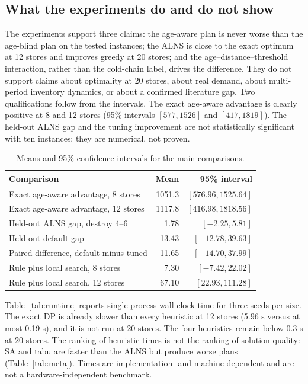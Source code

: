 \documentclass[preprint,12pt]{elsarticle}
\begin{document}
\subsection{What the experiments do and do not show}

The experiments support three claims: the age-aware plan is never worse than the age-blind plan on the tested instances; the ALNS is close to the exact optimum at 12 stores and improves greedy at 20 stores; and the age--distance--threshold interaction, rather than the cold-chain label, drives the difference. They do not support claims about optimality at 20 stores, about real demand, about multi-period inventory dynamics, or about a confirmed literature gap. Two qualifications follow from the intervals. The exact age-aware advantage is clearly positive at 8 and 12 stores (95\% intervals $[577,1526]$ and $[417,1819]$). The held-out ALNS gap and the tuning improvement are not statistically significant with ten instances; they are numerical, not proven.

\begin{table}[t]
\centering
\caption{Means and 95\% confidence intervals for the main comparisons.}
\label{tab:ci}
\begin{tabular}{lrr}
\toprule
Comparison & Mean & 95\% interval \\
\midrule
Exact age-aware advantage, 8 stores & 1051.3 & $[576.96,1525.64]$ \\
Exact age-aware advantage, 12 stores & 1117.8 & $[416.98,1818.56]$ \\
Held-out ALNS gap, destroy 4--6 & 1.78 & $[-2.25,5.81]$ \\
Held-out default gap & 13.43 & $[-12.78,39.63]$ \\
Paired difference, default minus tuned & 11.65 & $[-14.70,37.99]$ \\
Rule plus local search, 8 stores & 7.30 & $[-7.42,22.02]$ \\
Rule plus local search, 12 stores & 67.10 & $[22.93,111.28]$ \\
\bottomrule
\end{tabular}
\end{table}

Table~\ref{tab:runtime} reports single-process wall-clock time for three seeds per size. The exact DP is already slower than every heuristic at 12 stores (5.96 s versus at most 0.19 s), and it is not run at 20 stores. The four heuristics remain below 0.3 s at 20 stores. The ranking of heuristic times is not the ranking of solution quality: SA and tabu are faster than the ALNS but produce worse plans (Table~\ref{tab:meta}). Times are implementation- and machine-dependent and are not a hardware-independent benchmark.
\end{document}
